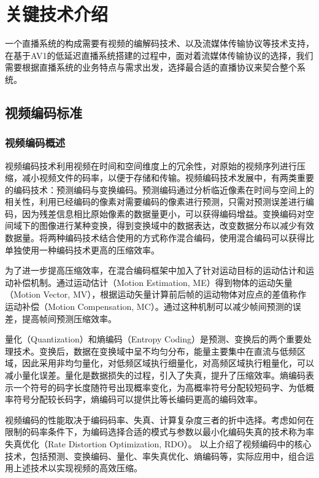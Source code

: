 
\chapter{关键技术介绍}

一个直播系统的构成需要有视频的编解码技术、以及流媒体传输协议等技术支持，在基于AV1的低延迟直播系统搭建的过程中，面对着流媒体传输协议的选择，我们需要根据直播系统的业务特点与需求出发，选择最合适的直播协议来契合整个系统。

\section{视频编码标准}

\subsection{视频编码概述}

视频编码技术利用视频在时间和空间维度上的冗余性，对原始的视频序列进行压缩，减小视频文件的码率，以便于存储和传输。视频编码技术发展中，有两类重要的编码技术：预测编码与变换编码。预测编码通过分析临近像素在时间与空间上的相关性，利用已经编码的像素对需要编码的像素进行预测，只需对预测误差进行编码，因为残差信息相比原始像素的数据量更小，可以获得编码增益。变换编码对空间域下的图像进行某种变换，得到变换域中的数据表达，改变数据分布以减少有效数据量。将两种编码技术结合使用的方式称作混合编码，使用混合编码可以获得比单独使用一种编码技术更高的压缩效率。

为了进一步提高压缩效率，在混合编码框架中加入了针对运动目标的运动估计和运动补偿机制。通过运动估计（Motion Estimation, ME）得到物体的运动矢量（Motion Vector, MV），根据运动矢量计算前后帧的运动物体对应点的差值称作运动补偿（Motion Compensation, MC）。通过这种机制可以减少帧间预测的误差，提高帧间预测压缩效率。

量化（Quantization）和熵编码（Entropy Coding）是预测、变换后的两个重要处理技术。变换后，数据在变换域中呈不均匀分布，能量主要集中在直流与低频区域，因此采用非均匀量化，对低频区域执行细量化，对高频区域执行粗量化，可以减小量化误差。量化是数据损失的过程，引入了失真，提升了压缩效率。熵编码表示一个符号的码字长度随符号出现概率变化，为高概率符号分配较短码字、为低概率符号分配较长码字，熵编码可以提供比等长编码更高的编码效率。

视频编码的性能取决于编码码率、失真、计算复杂度三者的折中选择。考虑如何在限制的码率条件下，为编码选择合适的模式与参数以最小化编码失真的技术称为率失真优化\cite{sullivanRatedistortionOptimizationVideo1998}（Rate Distortion Optimization, RDO）。
以上介绍了视频编码中的核心技术，包括预测、变换编码、量化、率失真优化、熵编码等，实际应用中，组合运用上述技术以实现视频的高效压缩。
